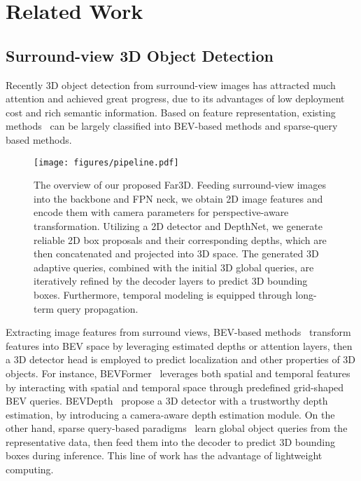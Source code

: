 \documentclass[letterpaper]{article} \usepackage{aaai24}
\begin{document}
 \section{Related Work}



\subsection{Surround-view 3D Object Detection}
Recently 3D object detection from surround-view images has attracted much attention and achieved great progress, due to its advantages of low deployment cost and rich semantic information. 
Based on feature representation, existing methods~\cite{wang2021fcos3d, wang2022detr3d, liu2022petr, huang2022bevdet4d, li2023bevdepth, li2022bevstereo, jiang2023polarformer, liu2022petrv2,  li2022bevformer, yang2023bevformer, park2022time, wang2023exploring, zong2023temporal, liu2023towards} can be largely classified into BEV-based methods and sparse-query based methods.  \begin{figure*}[t]
\centering
\texttt{[image: figures/pipeline.pdf]}
\caption{The overview of our proposed Far3D. 
Feeding surround-view images into the backbone and FPN neck, we obtain 2D image features and encode them with camera parameters for perspective-aware transformation. 
Utilizing a 2D detector and DepthNet, we generate reliable 2D box proposals and their corresponding depths, which are then concatenated and projected into 3D space. 
The generated 3D adaptive queries, combined with the initial 3D global queries, are iteratively refined by the decoder layers to predict 3D bounding boxes. Furthermore, temporal modeling is equipped through long-term query propagation.
}
\label{fig:method_overall}
\vspace{-0.3cm}
\end{figure*}

Extracting image features from surround views, BEV-based methods~\cite{huang2021bevdet, huang2022bevdet4d, li2023bevdepth, li2022bevformer} transform features into BEV space by leveraging estimated depths or attention layers, then a 3D detector head is employed to predict localization and other properties of 3D objects. 
For instance, 
BEVFormer~\cite{li2022bevformer} leverages both spatial and temporal
features by interacting with spatial and temporal space through predefined grid-shaped BEV queries.
BEVDepth~\cite{li2023bevdepth} propose a 3D detector with a trustworthy depth estimation, by introducing a camera-aware depth estimation module.
On the other hand, sparse query-based paradigms~\cite{wang2022detr3d, liu2022petr} learn global object queries from the representative data, then feed them into the decoder to predict 3D bounding boxes during inference. This line of work has the advantage of lightweight computing. 
\end{document}
